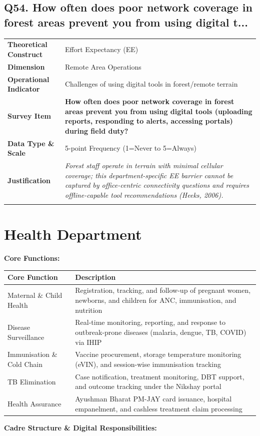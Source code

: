 \documentclass[11pt,a4paper]{article}
\makeatletter
\newcommand{\qcard}[8]{%
\noindent\begin{tabularx}{\textwidth}{@{}>{\columncolor{#7}\bfseries\small}L{3.2cm}|X@{}}
\arrayrulecolor{#8}\hline
Theoretical Construct & #1 \\
Dimension & #2 \\
Operational Indicator & #3 \\
\arrayrulecolor{gold}\hline
\rowcolor{white}\textbf{\color{#8}Survey Item} & \textbf{\color{#8}#4} \\
\arrayrulecolor{gold}\hline
Data Type \& Scale & #5 \\
Justification & \textit{#6} \\
\arrayrulecolor{#8}\hline
\end{tabularx}\vspace{10pt}
}
\makeatother
\begin{document}
\subsection*{Q54. How often does poor network coverage in forest areas prevent you from using digital t...}
\qcard{Effort Expectancy (EE)}{Remote Area Operations}{Challenges of using digital tools in forest/remote terrain}{How often does poor network coverage in forest areas prevent you from using digital tools (uploading reports, responding to alerts, accessing portals) during field duty?}{5-point Frequency (1=Never to 5=Always)}{Forest staff operate in terrain with minimal cellular coverage; this department-specific EE barrier cannot be captured by office-centric connectivity questions and requires offline-capable tool recommendations (Heeks, 2006).}{forbg}{forcol}


\section{\textcolor{hlcol}{Health Department}}

\textbf{Core Functions:}

\begin{table}[H]\centering\small
\begin{tabularx}{\textwidth}{L{3cm} X}
\toprule
\textbf{Core Function} & \textbf{Description} \\
\midrule
Maternal \& Child Health & Registration, tracking, and follow-up of pregnant women, newborns, and children for ANC, immunisation, and nutrition \\[3pt]
Disease Surveillance & Real-time monitoring, reporting, and response to outbreak-prone diseases (malaria, dengue, TB, COVID) via IHIP \\[3pt]
Immunisation \& Cold Chain & Vaccine procurement, storage temperature monitoring (eVIN), and session-wise immunisation tracking \\[3pt]
TB Elimination & Case notification, treatment monitoring, DBT support, and outcome tracking under the Nikshay portal \\[3pt]
Health Assurance & Ayushman Bharat PM-JAY card issuance, hospital empanelment, and cashless treatment claim processing \\
\bottomrule
\end{tabularx}
\end{table}


\textbf{Cadre Structure \& Digital Responsibilities:}
\end{document}
